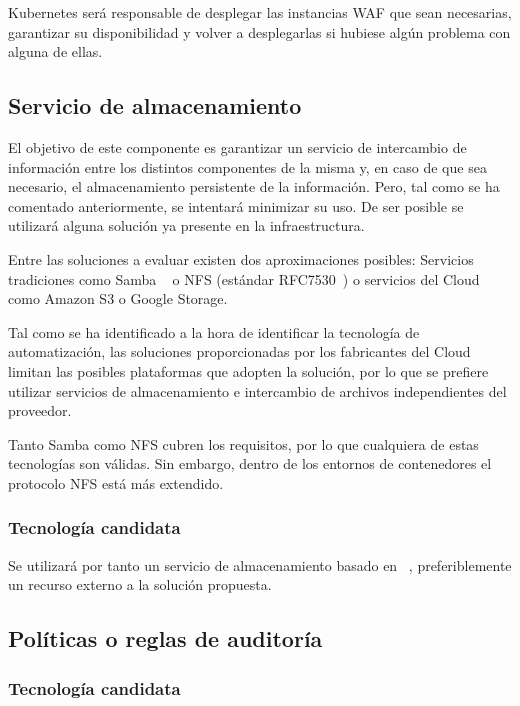 \par Kubernetes será responsable de desplegar las instancias WAF que sean necesarias, garantizar su disponibilidad y volver a desplegarlas si hubiese algún problema con alguna de ellas.

\subsection{Servicio de almacenamiento}
\par El objetivo de este componente es garantizar un servicio de intercambio de información entre los distintos componentes de la misma y, en caso de que sea
necesario, el almacenamiento persistente de la información. Pero, tal como se ha comentado anteriormente, se intentará minimizar su uso. De ser posible se
utilizará alguna solución ya presente en la infraestructura.
\par Entre las soluciones a evaluar existen dos aproximaciones posibles: Servicios tradiciones como Samba ~\cite{samba} o  NFS (estándar RFC7530~\cite{nfs}) o
servicios del Cloud como Amazon S3\cite{s3} o Google Storage\cite{GoogleStorage}.

\par Tal como se ha identificado a la hora de identificar la tecnología de automatización, las soluciones proporcionadas por los fabricantes del Cloud limitan
las posibles plataformas que adopten la solución, por lo que se prefiere utilizar servicios de almacenamiento e intercambio de archivos independientes del
proveedor.
\par Tanto Samba como NFS cubren los requisitos, por lo que cualquiera de estas tecnologías son válidas. Sin embargo, dentro de los entornos de contenedores el
protocolo NFS está más extendido.

\subsubsection{Tecnología candidata}
\par Se utilizará por tanto un servicio de almacenamiento basado en ~\cite{nfs}, preferiblemente un recurso externo a la solución propuesta.

\subsection{Políticas o reglas de auditoría}

\subsubsection{Tecnología candidata}

